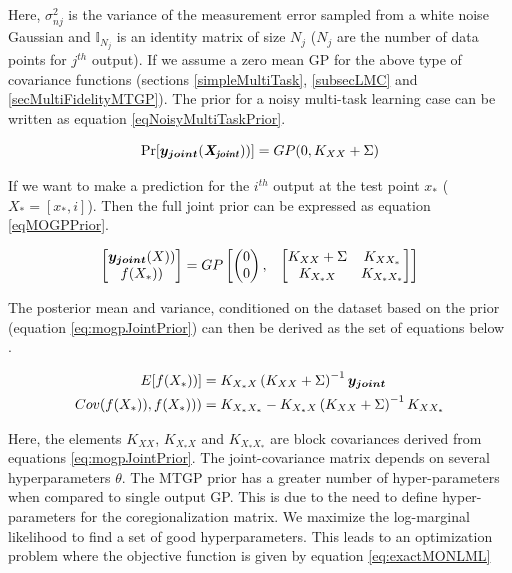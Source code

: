 Here, \(\sigma_{nj}^2\) is the variance of the measurement error sampled from a white noise Gaussian and \(\mathbb{I}_{N_{j}}\) is an identity matrix of size \(N_{j}\) (\(N_{j}\) are the number of data points for \(j^{th}\) output). If we assume a zero mean GP for the above type of covariance functions (sections \ref{simpleMultiTask}, \ref{subsecLMC} and \ref{secMultiFidelityMTGP}). The prior for a noisy multi-task learning case can be written as equation \ref{eqNoisyMultiTaskPrior}.

\begin{equation}\label{eqNoisyMultiTaskPrior}
         \Pr[\boldsymbol{y_{joint}}(\bm{\mathit{X_{joint}}}))] = GP(0, K_{XX} + \Sigma)
\end{equation}
      
If we want to make a prediction for the $i^{th}$ output at the test point $x_{*}$ ($X_{*} = [x_{*}, i]$). Then the full joint prior can be expressed as equation \ref{eqMOGPPrior}.
 
 \begin{equation}\label{eqMOGPPrior}
 \begin{bmatrix}
   \boldsymbol{y_{joint}}(X))\\ 
   f(X_{*}))
   \end{bmatrix} = GP\begin{bmatrix}
   \begin{pmatrix}
   0\\ 
   0
   \end{pmatrix}, 
   & 
   \begin{bmatrix}
   K_{XX} + \Sigma & K_{XX_{*}}\\ 
   K_{X_{*}X} & K_{X_{*}X_{*}}
   \end{bmatrix} 

   \end{bmatrix} 
 \end{equation}

  
The posterior mean and variance, conditioned on the dataset based on the prior (equation \ref{eq:mogpJointPrior}) can then be derived as the set of equations below .

\begin{align}
  E[f(X_{*}))] & = K_{X_{*}X}\left ( K_{XX} + \Sigma \right )^{-1}\boldsymbol{y_{joint}} \label{eq:predictiveMOMean} \\ 
  Cov(f(X_{*})), f(X_{*}))) & = K_{X_{*}X_{*}} - K_{X_{*}X}\left ( K_{XX} + \Sigma \right )^{-1}K_{XX_{*}} \label{eq:predictiveMOCovariance}
\end{align}
  
Here, the elements \(K_{XX}\), \(K_{X_{*}X}\) and \(K_{X_{*}X_{*}}\) are block covariances derived from equations \ref{eq:mogpJointPrior}. The joint-covariance matrix depends on several hyperparameters \(\theta\). The MTGP prior has a greater number of hyper-parameters when compared to single output GP. This is due to the need to define hyper-parameters for the coregionalization matrix. We maximize the log-marginal likelihood to find a set of good hyperparameters. This leads to an optimization problem where the objective function is given by equation \ref{eq:exactMONLML} 
  
